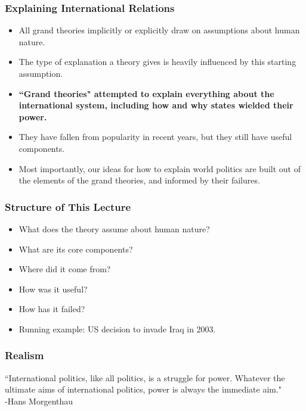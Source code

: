 \documentclass{beamer}
\begin{document}
\begin{frame} 
	\frametitle{\LARGE{Explaining International Relations}}
	\begin{itemize}
	    \item All grand theories implicitly or explicitly draw on assumptions about human nature. \pause
	    \item The type of explanation a theory gives is heavily influenced by this starting assumption. \pause
	    \item \textbf{``Grand theories" attempted to explain everything about the international system, including how and why states wielded their power.} \pause
	    \item They have fallen from popularity in recent years, but they still have useful components. \pause
	    \item Most importantly, our ideas for how to explain world politics are built out of the elements of the grand theories, and informed by their failures.   
	\end{itemize}  
\end{frame}

\begin{frame} 
	\frametitle{\LARGE{Structure of This Lecture}}
	\begin{itemize}
	    \item What does the theory assume about human nature? \pause
	    \item What are its core components? \pause
	    \item Where did it come from? \pause
	    \item How was it useful? \pause
	    \item How has it failed? \pause
	    \item Running example: US decision to invade Iraq in 2003.
	\end{itemize}	  
\end{frame}



\begin{frame} 
\frametitle{\LARGE{Realism}}
``International politics, like all politics, is a struggle for power. Whatever the ultimate aims of international politics, power is always the immediate aim." \\
\hspace*{160pt} -Hans Morgenthau
\end{frame}
\end{document}
